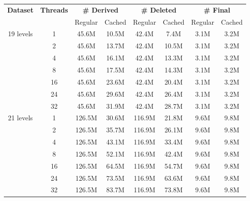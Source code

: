 \begin{tabular}{c | c || c c | c c | c c} \hline
	 \multirow{2}{*}{\textbf{Dataset}} & \multirow{2}{*}{\textbf{Threads}} & \multicolumn{2}{c|}{\textbf{\# Derived}} & \multicolumn{2}{c|}{\textbf{\# Deleted}} & \multicolumn{2}{c}{\textbf{\# Final}}\\
	 & & Regular & Cached & Regular & Cached & Regular & Cached\\ \hline \hline
\multirow{7}{*}{19 levels}  & 1 &  45.6M & 10.5M &  42.4M & 7.4M &  3.1M & 3.2M \\
 & 2 &  45.6M & 13.7M &  42.4M & 10.5M &  3.1M & 3.2M \\
 & 4 &  45.6M & 16.1M &  42.4M & 13.3M &  3.1M & 3.2M \\
 & 8 &  45.6M & 17.5M &  42.4M & 14.3M &  3.1M & 3.2M \\
 & 16 &  45.6M & 23.6M &  42.4M & 20.4M &  3.1M & 3.2M \\
 & 24 &  45.6M & 29.6M &  42.4M & 26.4M &  3.1M & 3.2M \\
 & 32 &  45.6M & 31.9M &  42.4M & 28.7M &  3.1M & 3.2M \\
	\hline
\multirow{7}{*}{21 levels}  & 1 &  126.5M & 30.6M &  116.9M & 21.8M &  9.6M & 9.8M \\
 & 2 &  126.5M & 35.7M &  116.9M & 26.1M &  9.6M & 9.8M \\
 & 4 &  126.5M & 43.1M &  116.9M & 33.4M &  9.6M & 9.8M \\
 & 8 &  126.5M & 52.1M &  116.9M & 42.4M &  9.6M & 9.8M \\
 & 16 &  126.5M & 64.5M &  116.9M & 54.7M &  9.6M & 9.8M \\
 & 24 &  126.5M & 73.5M &  116.9M & 63.6M &  9.6M & 9.8M \\
 & 32 &  126.5M & 83.7M &  116.9M & 73.8M &  9.6M & 9.8M \\
	\hline
\end{tabular}
